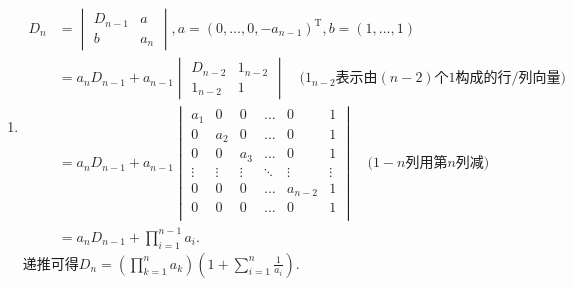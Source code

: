 \documentclass[12pt,fontset=fandol]{ctexart}
\begin{document}
\begin{solve}
\begin{enumerate}
                \item \begin{align*}
                          D_n & =\begin{vmatrix}
                                     D_{n-1} & a   \\
                                     b       & a_n
                                 \end{vmatrix},a=(0, \ldots, 0, -a_{n-1})^\mathrm{T}, b=(1, \ldots, 1) \\
                              & =a_nD_{n-1}+a_{n-1}\begin{vmatrix}
                                                       D_{n-2} & 1_{n-2} \\
                                                       1_{n-2} & 1
                                                   \end{vmatrix}
                          \quad \text{($1_{n-2}$表示由$(n-2)$个1构成的行/列向量)}                      \\
                              & =a_nD_{n-1}+a_{n-1}
                          \begin{vmatrix}
                              a_1    & 0      & 0      & \ldots & 0       & 1      \\
                              0      & a_2    & 0      & \ldots & 0       & 1      \\
                              0      & 0      & a_3    & \ldots & 0       & 1      \\
                              \vdots & \vdots & \vdots & \ddots & \vdots  & \vdots \\
                              0      & 0      & 0      & \ldots & a_{n-2} & 1      \\
                              0      & 0      & 0      & \ldots & 0       & 1      \\
                          \end{vmatrix} \quad \text{($1-n$列用第$n$列减)}                         \\
                              & =a_nD_{n-1}+\prod_{i=1}^{n-1}a_i.
                      \end{align*}
                      递推可得$\displaystyle D_n=\left(\prod_{k=1}^na_k\right)
                          \left(1+\sum_{i=1}^n\frac{1}{a_i}\right)$.


\end{enumerate}
\end{solve}
\end{document}
